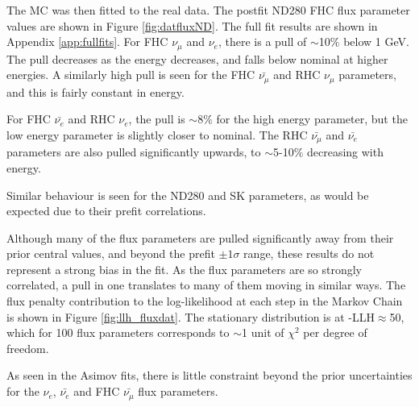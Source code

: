 The MC was then fitted to the real data. The postfit ND280 FHC flux parameter values are shown in Figure \ref{fig:datfluxND}. The full fit results are shown in Appendix \ref{app:fullfits}. For FHC $\nu_{\mu}$ and $\nu_e$, there is a pull of $\sim$10$\%$ below 1 GeV. The pull decreases as the energy decreases, and falls below nominal at higher energies. A similarly high pull is seen for the FHC $\bar{\nu_{\mu}}$ and RHC $\nu_{\mu}$ parameters, and this is fairly constant in energy.

For FHC $\bar{\nu_e}$ and RHC $\nu_e$, the pull is $\sim$8$\%$ for the high energy parameter, but the low energy parameter is slightly closer to nominal. The RHC $\bar{\nu_{\mu}}$ and $\bar{\nu_e}$ parameters are also pulled significantly upwards, to $\sim$5-10$\%$ decreasing with energy.

Similar behaviour is seen for the ND280 and SK parameters, as would be expected due to their prefit correlations.

Although many of the flux parameters are pulled significantly away from their prior central values, and beyond the prefit $\pm1\sigma$ range, these results do not represent a strong bias in the fit. As the flux parameters are so strongly correlated, a pull in one translates to many of them moving in similar ways. The flux penalty contribution to the log-likelihood at each step in the Markov Chain is shown in Figure \ref{fig:llh_fluxdat}. The stationary distribution is at -LLH$\approx$50, which for 100 flux parameters corresponds to $\sim$1 unit of $\chi^2$ per degree of freedom.

As seen in the Asimov fits, there is little constraint beyond the prior uncertainties for the $\nu_e$, $\bar{\nu_e}$ and FHC $\bar{\nu_{\mu}}$ flux parameters.

